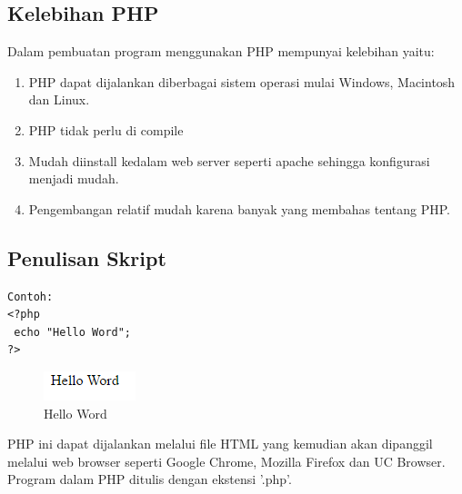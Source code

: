 \subsection{Kelebihan PHP}
Dalam pembuatan program menggunakan PHP mempunyai kelebihan yaitu:
\begin{enumerate}
\item PHP dapat dijalankan diberbagai sistem operasi mulai Windows, Macintosh dan Linux.
\item PHP tidak perlu di compile
\item Mudah diinstall kedalam web server seperti apache sehingga konfigurasi menjadi mudah.
\item Pengembangan relatif mudah karena banyak yang membahas tentang PHP.
\end{enumerate}

\subsection{Penulisan Skript}
\begin{lstlisting}
Contoh:
<?php
 echo "Hello Word";
?>
\end{lstlisting}
\begin{figure}[h]
\centering
\includegraphics[scale=1]{figures/hello}
\caption{Hello Word}
\label{hello}
\end{figure}
PHP ini dapat dijalankan melalui file HTML yang kemudian akan dipanggil melalui web browser seperti Google Chrome, Mozilla Firefox dan UC Browser.
Program dalam PHP ditulis dengan ekstensi '.php'.

